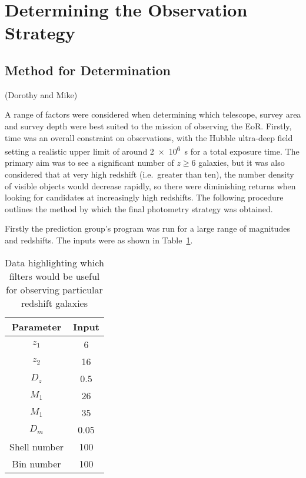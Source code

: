 
\clearpage
\section{Determining the Observation Strategy} %
\label{sec:method_for_strategy_choosing}
	\subsection{Method for Determination} %
	\label{sub:method_for_determination}
	(Dorothy and Mike)

		A range of factors were considered when determining which telescope, survey area and survey depth were best suited to the mission of observing the EoR. Firstly, time was an overall constraint on observations, with the Hubble ultra-deep field setting a realistic upper limit of around \SI{2e6}{\second} for a total exposure time. The primary aim was to see a significant number of $z\ge6$ galaxies, but it was also considered that at very high redshift (i.e.\ greater than ten), the number density of visible objects would decrease rapidly, so there were diminishing returns when looking for candidates at increasingly high redshifts. The following procedure outlines the method by which the final photometry strategy was obtained.

		Firstly the prediction group's program was run for a large range of magnitudes and redshifts. The inputs were as shown in Table~\ref{tab:program_inputs}.
		\begin{table}[htbp]
			\begin{center}
				\begin{tabular}{c|c}
					Parameter 	& Input \\
					\hline \hline
					$z_1$ & 6 \\
					$z_2$ & 16 \\
					$D_z$ & 0.5 \\
					$M_1$ & 26 \\
					$M_1$ & 35 \\
					$D_m$ & 0.05 \\
					Shell number & 100 \\
					Bin number & 100
				\end{tabular}
			\end{center}
			\caption{Data highlighting which filters would be useful for observing particular redshift galaxies\cite{Galactic_Astronomy_Binney_Merrifield}\label{tab:program_inputs}}
		\end{table}

